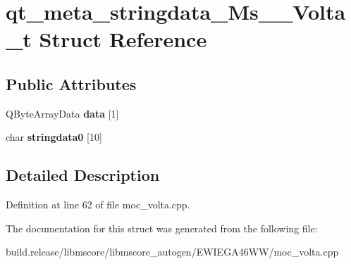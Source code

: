 \hypertarget{structqt__meta__stringdata___ms_____volta__t}{}\section{qt\+\_\+meta\+\_\+stringdata\+\_\+\+Ms\+\_\+\+\_\+\+Volta\+\_\+t Struct Reference}
\label{structqt__meta__stringdata___ms_____volta__t}
\subsection*{Public Attributes}
\begin{DoxyCompactItemize}
\item 
\mbox{\label{structqt__meta__stringdata___ms_____volta__t_a859c38ba3604c4bc931698d8f38b3478}} 
Q\+Byte\+Array\+Data {\bfseries data} \mbox{[}1\mbox{]}
\item 
\mbox{\label{structqt__meta__stringdata___ms_____volta__t_af9de61ef1d0876e7b4d7f78c7fb88fd1}} 
char {\bfseries stringdata0} \mbox{[}10\mbox{]}
\end{DoxyCompactItemize}


\subsection{Detailed Description}


Definition at line 62 of file moc\+\_\+volta.\+cpp.



The documentation for this struct was generated from the following file\+:\begin{DoxyCompactItemize}
\item 
build.\+release/libmscore/libmscore\+\_\+autogen/\+E\+W\+I\+E\+G\+A46\+W\+W/moc\+\_\+volta.\+cpp\end{DoxyCompactItemize}
